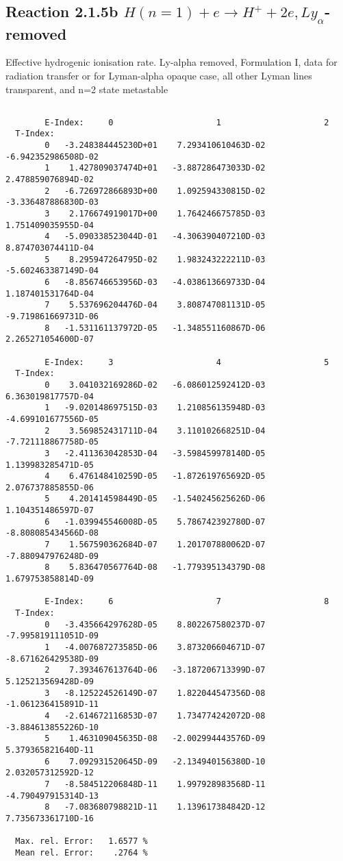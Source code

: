 \documentclass[12pt]{article}
\begin{document}
\subsection{
Reaction 2.1.5b  $H(n=1) + e \rightarrow H^+ + 2e, Ly_\alpha$-removed}


   Effective hydrogenic ionisation rate. 
   Ly-alpha removed, Formulation I, data for radiation transfer
   or for Lyman-alpha opaque case, all other Lyman lines transparent, 
   and n=2 state metastable
\begin{small}\begin{verbatim}

        E-Index:     0                     1                     2
  T-Index:
        0   -3.248384445230D+01    7.293410610463D-02   -6.942352986508D-02
        1    1.427809037474D+01   -3.887286473033D-02    2.478859076894D-02
        2   -6.726972866893D+00    1.092594330815D-02   -3.336487886830D-03
        3    2.176674919017D+00    1.764246675785D-03    1.751409035955D-04
        4   -5.090338523044D-01   -4.306390407210D-03    8.874703074411D-04
        5    8.295947264795D-02    1.983243222211D-03   -5.602463387149D-04
        6   -8.856746653956D-03   -4.038613669733D-04    1.187401531764D-04
        7    5.537696204476D-04    3.808747081131D-05   -9.719861669731D-06
        8   -1.531161137972D-05   -1.348551160867D-06    2.265271054600D-07

        E-Index:     3                     4                     5
  T-Index:
        0    3.041032169286D-02   -6.086012592412D-03    6.363019817757D-04
        1   -9.020148697515D-03    1.210856135948D-03   -4.699101677556D-05
        2    3.569852431711D-04    3.110102668251D-04   -7.721118867758D-05
        3   -2.411363042853D-04   -3.598459978140D-05    1.139983285471D-05
        4    6.476148410259D-05   -1.872619765692D-05    2.076737885855D-06
        5    4.201414598449D-05   -1.540245625626D-06    1.104351486597D-07
        6   -1.039945546008D-05    5.786742392780D-07   -8.808085434566D-08
        7    1.567590362684D-07    1.201707880062D-07   -7.880947976248D-09
        8    5.836470567764D-08   -1.779395134379D-08    1.679753858814D-09

        E-Index:     6                     7                     8
  T-Index:
        0   -3.435664297628D-05    8.802267580237D-07   -7.995819111051D-09
        1   -4.007687273585D-06    3.873206604671D-07   -8.671626429538D-09
        2    7.393467613764D-06   -3.187206713399D-07    5.125213569428D-09
        3   -8.125224526149D-07    1.822044547356D-08   -1.061236415891D-11
        4   -2.614672116853D-07    1.734774242072D-08   -3.884613855226D-10
        5    1.463109045635D-08   -2.002994443576D-09    5.379365821640D-11
        6    7.092931520645D-09   -2.134940156380D-10    2.032057312592D-12
        7   -8.584512206848D-11    1.997928983568D-11   -4.790497915314D-13
        8   -7.083680798821D-11    1.139617384842D-12    7.735673361710D-16

  Max. rel. Error:   1.6577 %
  Mean rel. Error:    .2764 %

\end{verbatim}\end{small}
\end{document}
